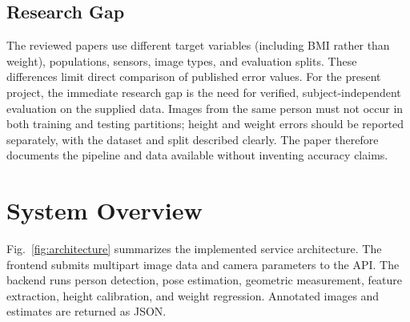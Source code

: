 \documentclass[conference]{IEEEtran}
\begin{document}
\subsection{Research Gap}
The reviewed papers use different target variables (including BMI rather than weight), populations, sensors, image types, and evaluation splits. These differences limit direct comparison of published error values. For the present project, the immediate research gap is the need for verified, subject-independent evaluation on the supplied data. Images from the same person must not occur in both training and testing partitions; height and weight errors should be reported separately, with the dataset and split described clearly. The paper therefore documents the pipeline and data available without inventing accuracy claims.

\section{System Overview}
Fig.~\ref{fig:architecture} summarizes the implemented service architecture. The frontend submits multipart image data and camera parameters to the API. The backend runs person detection, pose estimation, geometric measurement, feature extraction, height calibration, and weight regression. Annotated images and estimates are returned as JSON.
\end{document}
